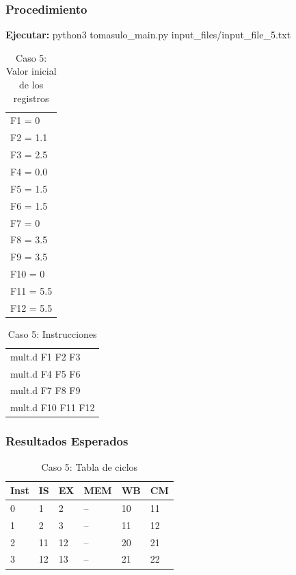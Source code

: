 \documentclass[a4paper]{article}
\begin{document}
	\subsubsection*{Procedimiento}

	\textbf{Ejecutar:} python3 tomasulo\_main.py input\_files/input\_file\_5.txt

	\begin{table}[H]
		\centering
		\caption*{Caso 5: Valor inicial de los registros}
		\begin{tabular}{l}
			F1 = 0 \\
			F2 = 1.1 \\
			F3 = 2.5 \\
			F4 = 0.0 \\
			F5 = 1.5 \\
			F6 = 1.5 \\
			F7 = 0 \\
			F8 = 3.5 \\
			F9 = 3.5 \\
			F10 = 0 \\
			F11 = 5.5 \\
			F12 = 5.5
		\end{tabular}
	\end{table}

	\begin{table}[H]
		\centering
		\caption*{Caso 5: Instrucciones}
		\begin{tabular}{l}
			mult.d F1 F2 F3 \\
			mult.d F4 F5 F6 \\
			mult.d F7 F8 F9 \\
			mult.d F10 F11 F12
		\end{tabular}
	\end{table}

	\subsubsection*{Resultados Esperados}

	\begin{table}[H]
		\centering
		\caption*{Caso 5: Tabla de ciclos}
		\begin{tabular}{|l|l|l|l|l|l|}
			\hline
			\textbf{Inst} & \textbf{IS} & \textbf{EX} & \textbf{MEM} & \textbf{WB} & \textbf{CM} \\ \hline
			0             & 1           & 2           & --           & 10          & 11          \\ \hline
			1             & 2           & 3           & --           & 11          & 12          \\ \hline
			2             & 11          & 12          & --           & 20          & 21          \\ \hline
			3             & 12          & 13          & --           & 21          & 22          \\ \hline
			\end{tabular}
	\end{table}
\end{document}
